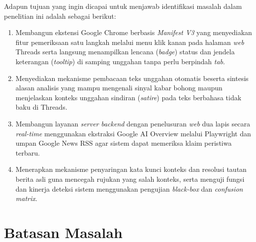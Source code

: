 \documentclass[12pt,a4paper,twoside]{report}
\begin{document}
Adapun tujuan yang ingin dicapai untuk menjawab identifikasi masalah dalam penelitian ini adalah sebagai berikut:
\begin{enumerate}[leftmargin=0.8cm,itemsep=3pt,topsep=2pt]
  \item Membangun ekstensi Google Chrome berbasis \textit{Manifest V3} yang menyediakan fitur pemeriksaan satu langkah melalui menu klik kanan pada halaman \textit{web} Threads serta langsung menampilkan lencana (\textit{badge}) status dan jendela keterangan (\textit{tooltip}) di samping unggahan tanpa perlu berpindah \textit{tab}.
  \item Menyediakan mekanisme pembacaan teks unggahan otomatis beserta sintesis alasan analisis yang mampu mengenali sinyal kabar bohong maupun menjelaskan konteks unggahan sindiran (\textit{satire}) pada teks berbahasa tidak baku di Threads.
  \item Membangun layanan \textit{server} \textit{backend} dengan penelusuran \textit{web} dua lapis secara \textit{real-time} menggunakan ekstraksi Google AI Overview melalui Playwright dan umpan Google News RSS agar sistem dapat memeriksa klaim peristiwa terbaru.
  \item Menerapkan mekanisme penyaringan kata kunci konteks dan resolusi tautan berita asli guna mencegah rujukan yang salah konteks, serta menguji fungsi dan kinerja deteksi sistem menggunakan pengujian \textit{black-box} dan \textit{confusion matrix}.
\end{enumerate}

\section{Batasan Masalah}
\end{document}
